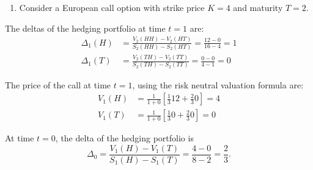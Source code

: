 \documentclass[11pt,a4,table]{article}
\begin{document}
\begin{enumerate}
\begin{enumerate}
        \item Consider a European call option with strike price $K=4$ and maturity $T=2$.
        \begin{figure}[hp]
        \end{figure}
    \end{enumerate}
    
    The deltas of the hedging portfolio at time $t=1$ are:
    \begin{align*}
        \Delta_1(H)&=\frac{V_2(HH)-V_2(HT)}{S_2(HH)-S_2(HT)}=\frac{12-0}{16-4}=1\\
        \Delta_1(T)&=\frac{V_2(TH)-V_2(TT)}{S_2(TH)-S_2(TT)}=\frac{0-0}{4-1}=0
    \end{align*}
    
    The price of the call at time $t=1$, using the risk neutral valuation formula are:
    \begin{align*}
        V_1(H) &= \frac{1}{1+0}\left[\frac{1}{3}12+\frac{2}{3}0\right] = 4\\
        V_1(T) &= \frac{1}{1+0}\left[\frac{1}{3}0+\frac{2}{3}0\right] = 0
    \end{align*}
    
    At time $t=0$, the delta of the hedging portfolio is
    \begin{equation*}
        \Delta_0 = \frac{V_1(H)-V_1(T)}{S_1(H)-S_1(T)}=\frac{4-0}{8-2}=\frac{2}{3}.
    \end{equation*}
    

\end{enumerate}
\end{document}
